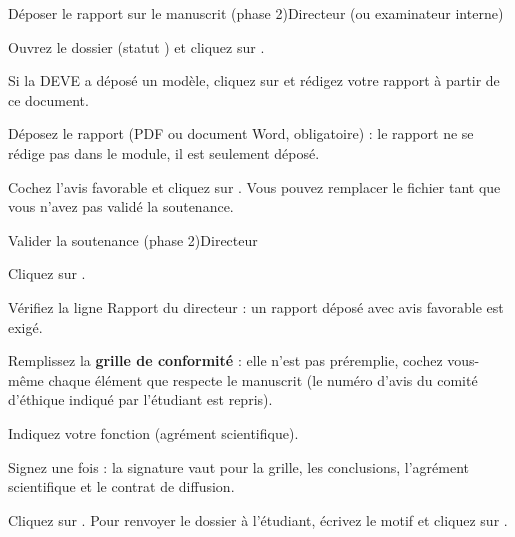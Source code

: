 \documentclass[11pt,a4paper]{article}
\begin{document}
\begin{procedure}{Déposer le rapport sur le manuscrit (phase 2)}{Directeur (ou examinateur interne)}
\begin{etapes}
  \item Ouvrez le dossier (statut )
        et cliquez sur .
  \item Si la DEVE a déposé un modèle, cliquez sur  et rédigez votre rapport à partir de ce document.
  \item Déposez le rapport (PDF ou document Word, obligatoire) : le rapport
        ne se rédige pas dans le module, il est seulement déposé.
  \item Cochez l'avis favorable et cliquez sur . Vous pouvez remplacer le fichier tant que vous n'avez pas
        validé la soutenance.
\end{etapes}
\end{procedure}


\begin{procedure}{Valider la soutenance (phase 2)}{Directeur}
\begin{etapes}
  \item Cliquez sur .
  \item Vérifiez la ligne \og Rapport du directeur\fg{} : un rapport déposé
        avec avis favorable est exigé.
  \item Remplissez la \textbf{grille de conformité} : elle n'est pas
        préremplie, cochez vous-même chaque élément que respecte le manuscrit
        (le numéro d'avis du comité d'éthique indiqué par l'étudiant est
        repris).
  \item Indiquez votre fonction (agrément scientifique).
  \item Signez une fois : la signature vaut pour la grille, les conclusions,
        l'agrément scientifique et le contrat de diffusion.
  \item Cliquez sur . Pour renvoyer le dossier à
        l'étudiant, écrivez le motif et cliquez sur .
\end{etapes}
\end{procedure}
\end{document}
